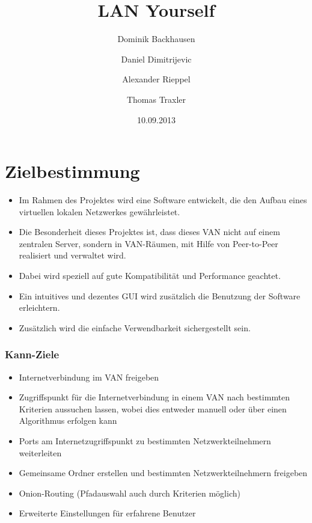 \documentclass[a4paper,12pt]{scrreprt}
\begin{document}
\author{Dominik Backhausen \and Daniel Dimitrijevic \and Alexander Rieppel \and Thomas Traxler}
\subject{Pflichtenheft}
\title{LAN Yourself}
\date{10.09.2013}
\maketitle
\tableofcontents

	
\chapter{Zielbestimmung}
	\begin{itemize}
	\item Im Rahmen des Projektes wird eine Software entwickelt, die den Aufbau eines virtuellen lokalen Netzwerkes gewährleistet.
	\item Die Besonderheit dieses Projektes ist, dass dieses VAN nicht auf einem zentralen Server, sondern in VAN-Räumen, mit Hilfe von Peer-to-Peer realisiert und verwaltet wird.
	\item Dabei wird speziell auf gute Kompatibilität und Performance geachtet.
	\item Ein intuitives und dezentes GUI wird zusätzlich die Benutzung der Software erleichtern.
	\item Zusätzlich wird die einfache Verwendbarkeit sichergestellt sein.
	\end{itemize}
	
	\subsection{Kann-Ziele}
	
	\begin{itemize}
	\item Internetverbindung im VAN freigeben
	\item Zugriffspunkt für die Internetverbindung in einem VAN nach bestimmten Kriterien aussuchen lassen, wobei dies entweder manuell oder über einen Algorithmus erfolgen kann
	\item Ports am Internetzugriffspunkt zu bestimmten Netzwerkteilnehmern weiterleiten
	\item Gemeinsame Ordner erstellen und bestimmten Netzwerkteilnehmern freigeben
	\item Onion-Routing (Pfadauswahl auch durch Kriterien möglich)
	\item Erweiterte Einstellungen für erfahrene Benutzer
	
	\end{itemize}
	
\end{document}
